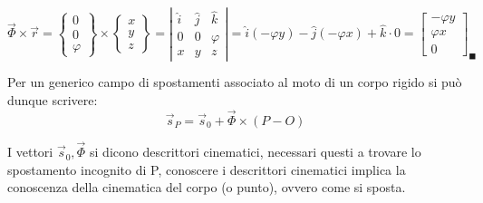 \documentclass{article}
\begin{document}
\begin{adjustwidth}{2in}{}
\[\vec{\Phi} \times \vec{r} =  \left\lbrace \begin{array}{c}
	0 \\
	0 \\
	\varphi
\end{array} \right\rbrace \times \left\lbrace \begin{array}{c}
x \\
y \\
z
\end{array} \right\rbrace = \left|  \begin{array}{ccc}
\hat{i} & \hat{j} & \hat{k} \\
0 & 0 & \varphi \\
x & y & z
\end{array} \right|  = \hat{i}(-\varphi y) - \hat{j}(-\varphi x) + \hat{k}\cdot 0 = \left[ \begin{array}{c}
-\varphi y \\
\varphi x   \\
0
\end{array} \right]_\blacksquare \]

Per un generico campo di spostamenti associato al moto di un corpo rigido si può dunque scrivere:
\[\vec{s}_P = \vec{s}_0 + \vec{\Phi} \times (P-O)\]

I vettori $ \vec{s}_0,\vec{\Phi}$ si dicono descrittori cinematici, necessari questi a trovare lo spostamento incognito di P, conoscere i descrittori cinematici implica la conoscenza della cinematica del corpo (o punto), ovvero come si sposta.

\newpage



\end{adjustwidth}
\end{document}
